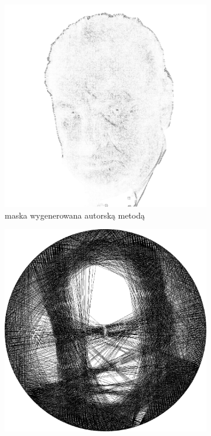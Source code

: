 \documentclass[a4paper, 12pt, polish, twoside]{extreport}
\begin{document}
\begin{figure}[H]
\begin{subfigure}{0.30\textwidth}
        \includegraphics[width = \textwidth]{img/6-comp/churchill_mask_c20_inv0_bg1_obj1_ed1.png}
        \caption{maska wygenerowana autorską metodą}
        \label{comp-comp-churchill-c}
    \end{subfigure}
    \begin{subfigure}{0.30\textwidth}
        \centering
        \includegraphics[width = \textwidth]{img/6-comp/churchill_e_i2500_c20_inv0_bg1_obj1_ed1.png}

\end{subfigure}
\end{figure}
\end{document}

